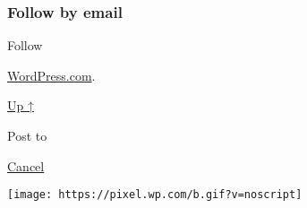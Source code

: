 \hypertarget{follow-by-email}{%
\subsubsection{Follow by email}\label{follow-by-email}}

Follow

\href{https://wordpress.com/?ref=footer_custom_com}{WordPress.com}.

\protect\hyperlink{}{Up ↑}

Post to

\protect\hyperlink{}{Cancel}

\texttt{[image: https://pixel.wp.com/b.gif?v=noscript]}
